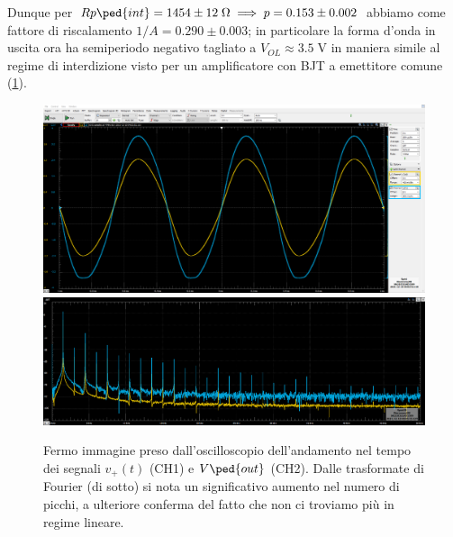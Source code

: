 \documentclass[10pt, a4paper, italian]{article}
\begin{document}
Dunque per
$Rp\ped{int} = 1454 \pm 12 \; \si{\ohm} \implies p = 0.153 \pm 0.002$ 
abbiamo come fattore di riscalamento $1/A = 0.290 \pm 0.003$; in particolare
la forma d'onda in uscita ora ha semiperiodo negativo tagliato a
$V_{OL} \approx 3.5 \; \si{\V}$ in maniera simile al regime di interdizione
visto per un amplificatore con BJT a emettitore comune (\cref{fig: Rpint}).
\begin{figure}[htbp]
	\centering
	\includegraphics[width=\textwidth, height=.25\paperheight]{Rpint1.2V}	
	\includegraphics[width=\textwidth]{Rpint1.2Vfft}
	\caption{Fermo immagine preso dall'oscilloscopio dell'andamento nel tempo dei
	segnali $v_+ (t)$ (CH1) e $V\ped{out}$ (CH2). Dalle trasformate di Fourier
	(di sotto) si nota un significativo aumento nel numero di picchi, a ulteriore
	conferma del fatto che non ci troviamo più in regime lineare.
	\label{fig: Rpint}}
\end{figure}
\end{document}
